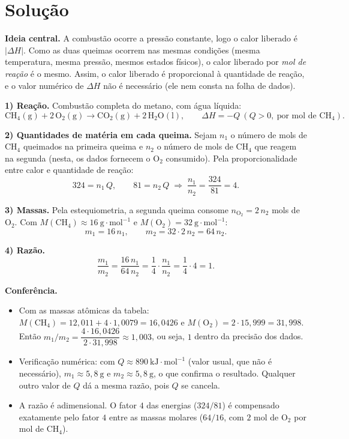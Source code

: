 \documentclass{article}%
\begin{document}
\section*{Solução}

\textbf{Ideia central.} A combustão ocorre a pressão constante, logo o calor liberado é $|\Delta H|$. Como as duas queimas ocorrem nas mesmas condições (mesma temperatura, mesma pressão, mesmos estados físicos), o calor liberado por \emph{mol de reação} é o mesmo. Assim, o calor liberado é proporcional à quantidade de reação, e o valor numérico de $\Delta H$ não é necessário (ele nem consta na folha de dados).

\medskip
\textbf{1) Reação.} Combustão completa do metano, com água líquida:
\[
\mathrm{CH_4(g)} + 2\,\mathrm{O_2(g)} \longrightarrow \mathrm{CO_2(g)} + 2\,\mathrm{H_2O(l)}, \qquad \Delta H = -Q \ (Q>0,\ \text{por mol de } \mathrm{CH_4}).
\]

\textbf{2) Quantidades de matéria em cada queima.} Sejam $n_1$ o número de mols de $\mathrm{CH_4}$ queimados na primeira queima e $n_2$ o número de mols de $\mathrm{CH_4}$ que reagem na segunda (nesta, os dados fornecem o $\mathrm{O_2}$ consumido). Pela proporcionalidade entre calor e quantidade de reação:
\[
324 = n_1\,Q, \qquad 81 = n_2\,Q \;\Longrightarrow\; \frac{n_1}{n_2} = \frac{324}{81} = 4 .
\]

\textbf{3) Massas.} Pela estequiometria, a segunda queima consome $n_{\mathrm{O_2}} = 2\,n_2$ mols de $\mathrm{O_2}$. Com $M(\mathrm{CH_4}) \approx 16\ \mathrm{g\cdot mol^{-1}}$ e $M(\mathrm{O_2}) = 32\ \mathrm{g\cdot mol^{-1}}$:
\[
m_1 = 16\,n_1, \qquad m_2 = 32\cdot 2\,n_2 = 64\,n_2 .
\]

\textbf{4) Razão.}
\[
\frac{m_1}{m_2} = \frac{16\,n_1}{64\,n_2} = \frac{1}{4}\cdot\frac{n_1}{n_2} = \frac{1}{4}\cdot 4 = 1 .
\]

\textbf{Conferência.}
\begin{itemize}
\item Com as massas atômicas da tabela: $M(\mathrm{CH_4}) = 12{,}011 + 4\cdot 1{,}0079 = 16{,}0426$ e $M(\mathrm{O_2}) = 2\cdot 15{,}999 = 31{,}998$. Então $m_1/m_2 = \dfrac{4\cdot 16{,}0426}{2\cdot 31{,}998} \approx 1{,}003$, ou seja, $1$ dentro da precisão dos dados.
\item Verificação numérica: com $Q \approx 890\ \mathrm{kJ\cdot mol^{-1}}$ (valor usual, que não é necessário), $m_1 \approx 5{,}8\ \mathrm{g}$ e $m_2 \approx 5{,}8\ \mathrm{g}$, o que confirma o resultado. Qualquer outro valor de $Q$ dá a mesma razão, pois $Q$ se cancela.
\item A razão é adimensional. O fator $4$ das energias ($324/81$) é compensado exatamente pelo fator $4$ entre as massas molares ($64/16$, com $2$ mol de $\mathrm{O_2}$ por mol de $\mathrm{CH_4}$).
\end{itemize}
\end{document}
